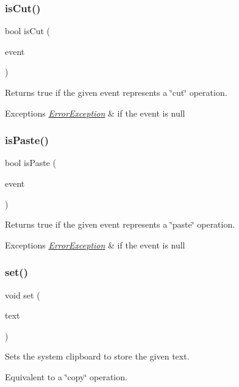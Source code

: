 \subsubsection{\texorpdfstring{is\+Cut()}{isCut()}}
{\footnotesize\ttfamily bool is\+Cut (\begin{DoxyParamCaption}\item[{Q\+Key\+Event $\ast$}]{event }\end{DoxyParamCaption})\hspace{0.3cm}{\ttfamily [static]}}



Returns true if the given event represents a \char`\"{}cut\char`\"{} operation. 


\begin{DoxyExceptions}{Exceptions}
{\em \mbox{\hyperlink{classErrorException}{Error\+Exception}}} & if the event is null \\
\hline
\end{DoxyExceptions}
\mbox{\label{classGClipboard_a26e3ab35c80c96117dd4bb455cf38c82}} 
\subsubsection{\texorpdfstring{is\+Paste()}{isPaste()}}
{\footnotesize\ttfamily bool is\+Paste (\begin{DoxyParamCaption}\item[{Q\+Key\+Event $\ast$}]{event }\end{DoxyParamCaption})\hspace{0.3cm}{\ttfamily [static]}}



Returns true if the given event represents a \char`\"{}paste\char`\"{} operation. 


\begin{DoxyExceptions}{Exceptions}
{\em \mbox{\hyperlink{classErrorException}{Error\+Exception}}} & if the event is null \\
\hline
\end{DoxyExceptions}
\mbox{\label{classGClipboard_a59ad3e94e40e8ef08c8a69a3a67377df}} 
\subsubsection{\texorpdfstring{set()}{set()}}
{\footnotesize\ttfamily void set (\begin{DoxyParamCaption}\item[{const std\+::string \&}]{text }\end{DoxyParamCaption})\hspace{0.3cm}{\ttfamily [static]}}



Sets the system clipboard to store the given text. 

Equivalent to a \char`\"{}copy\char`\"{} operation. 